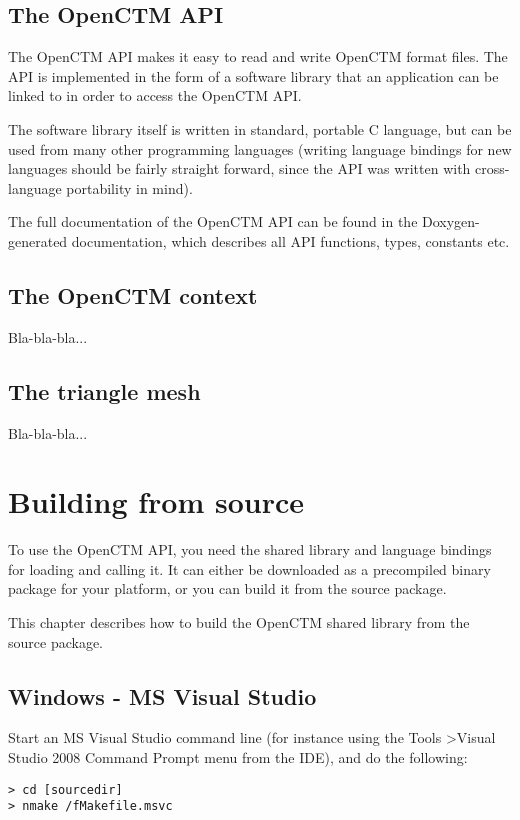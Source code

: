 \section{The OpenCTM API}
The OpenCTM API makes it easy to read and write OpenCTM format files. The API is
implemented in the form of a software library that an application can be linked
to in order to access the OpenCTM API.

The software library itself is written in standard, portable C language, but
can be used from many other programming languages (writing language bindings
for new languages should be fairly straight forward, since the API was written
with cross-language portability in mind).

The full documentation of the OpenCTM API can be found in the Doxygen-generated
documentation, which describes all API functions, types, constants etc.


\section{The OpenCTM context}
Bla-bla-bla...


\section{The triangle mesh}
Bla-bla-bla...




\chapter{Building from source}
To use the OpenCTM API, you need the shared library and language bindings
for loading and calling it. It can either be downloaded as a precompiled binary
package for your platform, or you can build it from the source package.

This chapter describes how to build the OpenCTM shared library from the source
package.

\section{Windows - MS Visual Studio}
Start an MS Visual Studio command line (for instance using the Tools
\textgreater Visual Studio 2008 Command Prompt menu from the IDE), and do the
following:

\begin{lstlisting}
> cd [sourcedir]
> nmake /fMakefile.msvc
\end{lstlisting}


